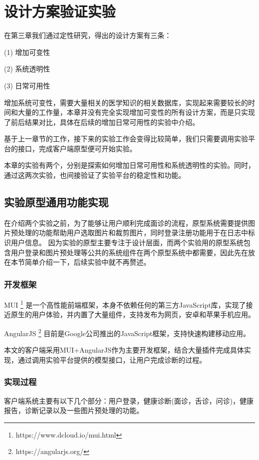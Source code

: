 \chapter{设计方案验证实验}

在第三章我们通过定性研究，得出的设计方案有三条：

(1) 增加可变性

(2) 系统透明性

(3) 日常可用性

增加系统可变性，需要大量相关的医学知识的相关数据库，实现起来需要较长的时间和大量的工作量，本章并没有完全实现增加可变性的所有设计方案，而是只实现了前后结果对比，具体在后续的增加日常可用性的实验中介绍。

基于上一章节的工作，接下来的实验工作会变得比较简单，我们只需要调用实验平台的接口，完成客户端原型便可开始实验。

本章的实验有两个，分别是探索如何增加日常可用性和系统透明性的实验。同时，通过这两次实验，也间接验证了实验平台的稳定性和功能。

\section{实验原型通用功能实现}
在介绍两个实验之前，为了能够让用户顺利完成面诊的流程，原型系统需要提供图片预处理的功能帮助用户选取图片和裁剪图片，同时登录注册功能用于在日志中标识用户信息。
因为实验的原型主要专注于设计层面，而两个实验用的原型系统包含用户登录和图片预处理等公共的系统组件在两个原型系统中都需要，因此先在放在本节简单介绍一下，后续实验中就不再赘述。
\subsection{开发框架}
MUI \footnote{https://www.dcloud.io/mui.html} 是一个高性能前端框架，本身不依赖任何的第三方JavaScript库，实现了接近原生的用户体验，并内置了大量组件，支持发布为网页，安卓和苹果手机应用。

AngularJS \footnote{https://angularjs.org/} 目前是Google公司推出的JavaScript框架，支持快速构建移动应用。

本文的客户端采用MUI+AngularJS作为主要开发框架，结合大量插件完成具体实现，通过调用实验平台提供的模型接口，让用户完成诊断的过程。

\subsection{实现过程}

客户端系统主要有以下几个部分：用户登录，健康诊断(面诊，舌诊，问诊)，健康报告，诊断记录以及一些图片预处理的功能。

